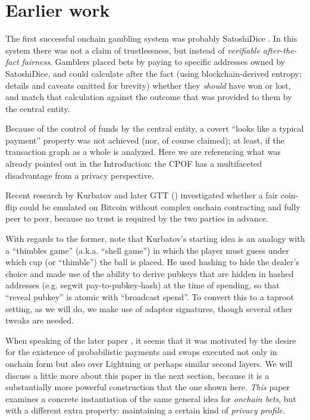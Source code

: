 \documentclass[11pt]{article}
\begin{document}
\section{Earlier work}
\label{sec:motivation}

The first successful onchain gambling system was probably SatoshiDice \cite{satoshidice}. In this system there was not a claim of trustlessness, but instead of \emph{verifiable after-the-fact fairness}. Gamblers placed bets by paying to specific addresses owned by SatoshiDice, and could calculate after the fact (using blockchain-derived entropy; details and caveats omitted for brevity) whether they \emph{should} have won or lost, and match that calculation against the outcome that was provided to them by the central entity.

Because of the control of funds by the central entity, a covert ``looks like a typical payment'' property was not achieved (nor, of course claimed); at least, if the transaction graph as a whole is analyzed. Here we are referencing what was already pointed out in the Introduction: the CPOF has a multifaceted disadvantage from a privacy perspective.

Recent research by Kurbatov and later GTT (\cite{kurbatov2025oprand,gerhardt2026}) investigated whether a fair coin-flip could be emulated on Bitcoin without complex onchain contracting and fully peer to peer, because no trust is required by the two parties in advance.

With regards to the former, note that Kurbatov's starting idea is an analogy with a ``thimbles game'' (a.k.a. ``shell game'') in which the player must guess under which cup (or ``thimble'') the ball is placed. He used hashing to hide the dealer's choice and made use of the ability to derive pubkeys that are hidden in hashed addresses (e.g. segwit pay-to-pubkey-hash) at the time of spending, so that ``reveal pubkey'' is atomic with ``broadcast spend''. To convert this to a taproot setting, as we will do, we make use of adaptor signatures, though several other tweaks are needed.

When speaking of the later paper \cite{gerhardt2026}, it seems that it was motivated by the desire for the existence of probabilistic payments and swaps executed not only in onchain form but also over Lightning or perhaps similar second layers. We will discuss a little more about this paper in the next section, because it is a substantially more powerful construction that the one shown here. \emph{This} paper examines a concrete instantiation of the same general idea for \emph{onchain bets}, but with a different extra property: maintaining a certain kind of \emph{privacy profile}.
\end{document}
